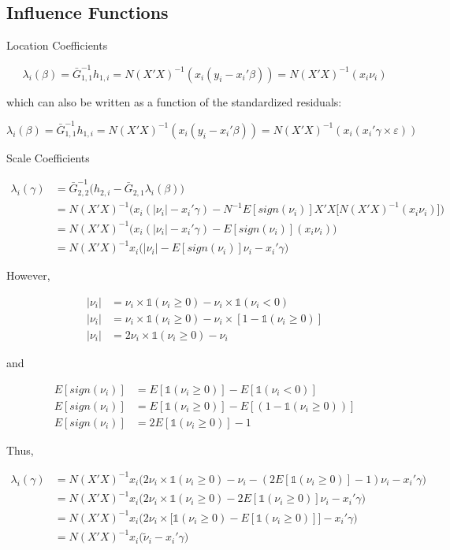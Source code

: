 \documentclass[
  authoryear,
  review,
  1p]{elsarticle}
\begin{document}
\subsection{Influence Functions}\label{influence-functions}

Location Coefficients

\[\lambda_i(\beta) = \bar G^{-1}_{1,1} h_{1,i} = N (X'X)^{-1}(x_i (y_i-x_i'\beta)) = N (X'X)^{-1}(x_i \nu_i)
\]

which can also be written as a function of the standardized residuals:

\[\lambda_i(\beta) = \bar G^{-1}_{1,1} h_{1,i} = N (X'X)^{-1}(x_i (y_i-x_i'\beta)) = N (X'X)^{-1}(x_i ( x_i'\gamma \times \varepsilon))
\]

Scale Coefficients

\[\begin{aligned}
\lambda_i(\gamma)&=\bar G_{2,2}^{-1}\Big(h_{2,i}-\bar G_{2,1} \lambda_i(\beta)\Big) \\
&=N (X'X)^{-1} \Big(x_i(|\nu_i|-x_i' \gamma) 
- N^{-1} E[sign(\nu_i)] X'X \big[ N (X'X)^{-1}(x_i \nu_i) \big] \Big) \\
&=N (X'X)^{-1} \Big(x_i(|\nu_i|-x_i' \gamma) - E[sign(\nu_i)] (x_i \nu_i)  \Big) \\
&=N (X'X)^{-1} x_i \Big( |\nu_i| - E[sign(\nu_i)] \nu_i -x_i' \gamma \Big) 
\end{aligned}
\]

However,

\[\begin{aligned}
|\nu_i| &= \nu_i \times \mathbb{1}(\nu_i \geq 0) - \nu_i \times \mathbb{1}(\nu_i < 0) \\
|\nu_i| &= \nu_i \times \mathbb{1}(\nu_i \geq 0) - \nu_i \times [1-\mathbb{1}(\nu_i \geq 0)] \\
|\nu_i| &= 2 \nu_i \times \mathbb{1}(\nu_i \geq 0) - \nu_i  
\end{aligned}
\]

and

\[\begin{aligned}
E[sign(\nu_i)] &= E[\mathbb{1}(\nu_i \geq 0)] - E[\mathbb{1}(\nu_i < 0)] \\
E[sign(\nu_i)] &= E[\mathbb{1}(\nu_i \geq 0)] - E[(1-\mathbb{1}(\nu_i \geq 0))] \\
E[sign(\nu_i)] &= 2 E[\mathbb{1}(\nu_i \geq 0)] - 1
\end{aligned}
\]

Thus,

\[\begin{aligned}
\lambda_i(\gamma) &= N(X'X)^{-1} x_i   \Big( 2 \nu_i \times \mathbb{1}(\nu_i \geq 0) - \nu_i  - ( 2 E[\mathbb{1}(\nu_i \geq 0)] - 1) \nu_i -x_i' \gamma \Big) \\
  &= N(X'X)^{-1} x_i   \Big( 2 \nu_i \times \mathbb{1}(\nu_i \geq 0) -  2 E[\mathbb{1}(\nu_i \geq 0)] \nu_i -x_i' \gamma \Big) \\
  &= N(X'X)^{-1} x_i   \Big( 2 \nu_i \times \big[ \mathbb{1}(\nu_i \geq 0) -  E[\mathbb{1}(\nu_i \geq 0)] \big] -x_i'\gamma \Big) \\
  &= N(X'X)^{-1} x_i   \Big( \tilde \nu_i -x_i' 
  \gamma \Big)
\end{aligned}
\]
\end{document}
